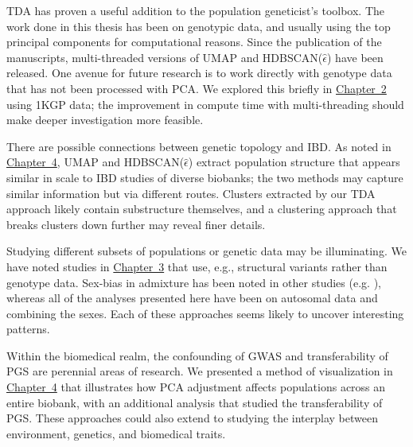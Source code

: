TDA has proven a useful addition to the population geneticist's toolbox. The work done in this thesis has been on genotypic data, and usually using the top principal components for computational reasons. Since the publication of the manuscripts, multi-threaded versions of UMAP and HDBSCAN($\hat{\epsilon}$) have been released. One avenue for future research is to work directly with genotype data that has not been processed with PCA. We explored this briefly in \hyperref[chap:chapter2]{Chapter~2} using 1KGP data; the improvement in compute time with multi-threading should make deeper investigation more feasible.

There are possible connections between genetic topology and IBD. As noted in \hyperref[chap:chapter4]{Chapter~4}, UMAP and HDBSCAN($\hat{\epsilon}$) extract population structure that appears similar in scale to IBD studies of diverse biobanks; the two methods may capture similar information but via different routes. Clusters extracted by our TDA approach likely contain substructure themselves, and a clustering approach that breaks clusters down further may reveal finer details.

Studying different subsets of populations or genetic data may be illuminating. We have noted studies in \hyperref[chap:chapter3]{Chapter~3} that use, e.g., structural variants rather than genotype data. Sex-bias in admixture has been noted in other studies (e.g. \citep{ongaro_evaluating_2021,korunes_sex-biased_2022,marcheco-teruel_cuba_2014}), whereas all of the analyses presented here have been on autosomal data and combining the sexes. Each of these approaches seems likely to uncover interesting patterns.

Within the biomedical realm, the confounding of GWAS and transferability of PGS are perennial areas of research. We presented a method of visualization in \hyperref[chap:chapter4]{Chapter~4} that illustrates how PCA adjustment affects populations across an entire biobank, with an additional analysis that studied the transferability of PGS. These approaches could also extend to studying the interplay between environment, genetics, and biomedical traits.